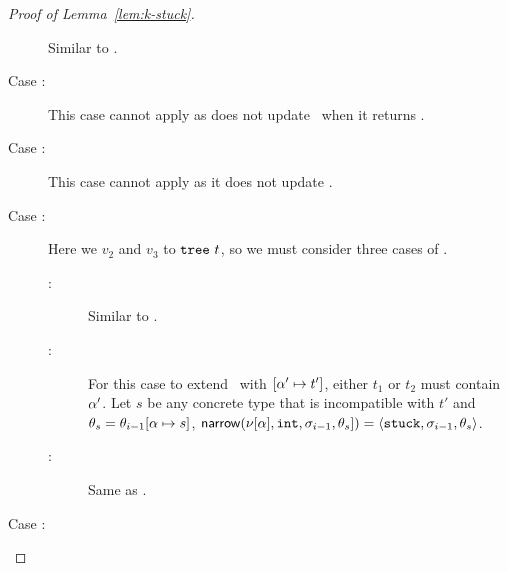 \begin{proof}[Proof of Lemma~\ref{lem:k-stuck}]
\begin{description}
      Similar to \replusgood.
    \item[Case \reappbad:]
      This case cannot apply as \forcesym does not update \tsu\ when
      it returns \stuck.
    \item[Case \releafgood:]
      This case cannot apply as it does not update \tsu.
    \item[Case \renodegood:]
      Here we \forcesym $v_2$ and $v_3$ to $\mathtt{tree}\ t$,
      so we must consider three cases of \forcesym.
      \begin{description}
      \item[:]
        Similar to \replusgood.
      \item[:]
        For this case to extend \tsu\ with $[\alpha' \mapsto t']$,
        either $t_1$ or $t_2$ must contain $\alpha'$.
        Let $s$ be any concrete type that is incompatible with $t'$
        and $\theta_s = \theta_{i-1}[\alpha \mapsto s]$,
        $\mathsf{narrow}(\nu[\alpha], \mathtt{int}, \sigma_{i-1}, \theta_s]) = \langle \mathtt{stuck}, \sigma_{i-1}, \theta_s \rangle$.
      \item[:]
        Same as .
      \end{description}
    \item[Case \renodebadone:]

\end{description}
\end{proof}
